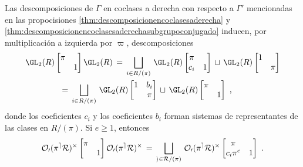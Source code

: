 \begin{propoDescomposicionDeLaCoclaseDobleMatrices}%
	\label{thm:descomposiciondelacoclasedoblematrices}
	Las descomposiciones de $\Gamma$ en coclases a derecha con respecto a
	$\Gamma'$ mencionadas en las propocisiones
	\ref{thm:descomposicionencoclasesaderecha} y
	\ref{thm:descomposicionencoclasesaderechasubgrupoconjugado} inducen,
	por multiplicaci\'{o}n a izquierda por $\varpi$, descomposiciones
	\begin{equation}
		\label{eq:descomposiciondelacoclasedoblematrices}
		\begin{aligned}
			& \GL_{2}(R)\begin{bmatrix} \pi & \\
				& 1 \end{bmatrix}\GL_{2}(R)
			\,=\,\bigsqcup_{i\in R/(\pi)}\,\GL_{2}(R)
				\begin{bmatrix} \pi & \\c_{i} & 1\end{bmatrix}
				\,\sqcup\,\GL_{2}(R)
				\begin{bmatrix} 1 & \\ & \pi \end{bmatrix} \\
			& \qquad\qquad\,=\,
			\bigsqcup_{i\in R/(\pi)}\,\GL_{2}(R)
				\begin{bmatrix} 1 & b_{i} \\ & \pi\end{bmatrix}
				\,\sqcup\,\GL_{2}(R)
				\begin{bmatrix} \pi & \\ & 1 \end{bmatrix} 
		\text{ ,}
		\end{aligned}
	\end{equation}
	donde los coeficientes $c_{i}$ y los coeficientes $b_{i}$ forman
	sistemas de representantes de las clases en $R/(\pi)$. Si $e\geq 1$,
	entonces
	\begin{equation}
		\label{eq:descomposiciondelacoclasedoblematricesbis}
		\cal{O}_{0}(\pi^{e}R)^{\times}
			\begin{bmatrix} \pi & \\ & 1 \end{bmatrix}
				\cal{O}_{0}(\pi^{e}R)^{\times}
			\,=\,\bigsqcup_{i\in R/(\pi)}\,
				\cal{O}_{0}(\pi^{e}R)^{\times}
			\begin{bmatrix} \pi & \\
				c_{i}\pi^{e} & 1\end{bmatrix}
		\text{ .}
	\end{equation}
\end{propoDescomposicionDeLaCoclaseDobleMatrices}


